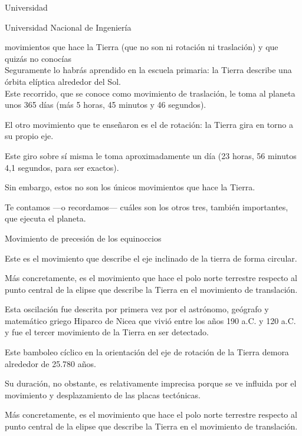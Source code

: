 \documentclass[12pt,a4paper]{article}
\begin{document}
	
\begin{center}
	Universidad
\end{center}
	
\noindent Universidad        Nacional de Ingeniería	




 movimientos que hace la Tierra (que no son ni rotación ni traslación) 
y que quizás no conocías\\


Seguramente lo habrás aprendido en la escuela primaria: la Tierra describe una órbita elíptica alrededor del Sol.\\[3cm]

Este recorrido, que se conoce como movimiento de traslación, le toma al planeta unos 365 días 
(más 5 horas, 45 minutos y 46 segundos).

El otro movimiento que te enseñaron es el de rotación: la Tierra gira en torno a su propio eje.

Este giro sobre sí misma le toma aproximadamente un día (23 horas, 56 minutos 4,1 segundos, para ser exactos). 

Sin embargo, estos no son los únicos movimientos que hace la Tierra.

Te contamos —o recordamos— cuáles son los otros tres, también importantes, que ejecuta el planeta.

Movimiento de precesión de los equinoccios

Este es el movimiento que describe el eje inclinado de la tierra de forma circular.

Más concretamente, es el movimiento que hace el polo norte terrestre respecto al punto central de la elipse 
que describe la Tierra en el movimiento de translación.

Esta oscilación fue descrita por primera vez por el astrónomo, geógrafo y matemático griego Hiparco de Nicea 
que vivió entre los años 190 a.C. y 120 a.C. y fue el tercer movimiento de la Tierra en ser detectado.

Este bamboleo cíclico en la orientación del eje de rotación de la Tierra demora alrededor de 25.780 años. 

Su duración, no obstante, es relativamente imprecisa porque se ve influida por el movimiento y desplazamiento 
de las placas tectónicas.

Más concretamente, es el movimiento que hace el polo norte terrestre respecto al punto central de la elipse 
que describe la Tierra en el movimiento de translación.
\end{document}
